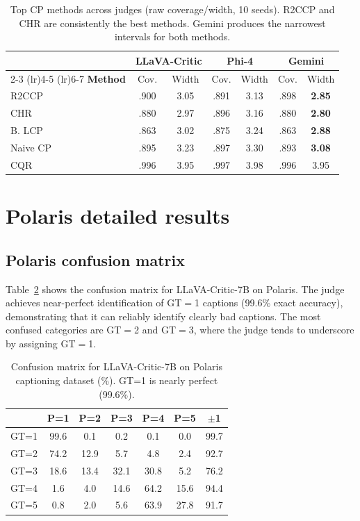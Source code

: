 \documentclass{article}
\begin{document}
\begin{table}[t]
\centering
\caption{Top CP methods across judges (raw coverage/width, 10 seeds). R2CCP and CHR are consistently the best methods. Gemini produces the narrowest intervals for both methods.}
\label{tab:all_methods_all_judges}
\small
\begin{tabular}{lcccccc}
\toprule
& \multicolumn{2}{c}{\textbf{LLaVA-Critic}} & \multicolumn{2}{c}{\textbf{Phi-4}} & \multicolumn{2}{c}{\textbf{Gemini}} \\
\cmidrule(lr){2-3} \cmidrule(lr){4-5} \cmidrule(lr){6-7}
\textbf{Method} & Cov. & Width & Cov. & Width & Cov. & Width \\
\midrule
R2CCP & .900 & 3.05 & .891 & 3.13 & .898 & \textbf{2.85} \\
CHR & .880 & 2.97 & .896 & 3.16 & .880 & \textbf{2.80} \\
B. LCP & .863 & 3.02 & .875 & 3.24 & .863 & \textbf{2.88} \\
Naive CP & .895 & 3.23 & .897 & 3.30 & .893 & \textbf{3.08} \\
CQR & .996 & 3.95 & .997 & 3.98 & .996 & 3.95 \\
\bottomrule
\end{tabular}
\end{table}

\section{Polaris detailed results}
\label{app:polaris}

\subsection{Polaris confusion matrix}

Table~\ref{tab:polaris_confusion} shows the confusion matrix for LLaVA-Critic-7B on Polaris. The judge achieves near-perfect identification of GT$=$1 captions (99.6\% exact accuracy), demonstrating that it can reliably identify clearly bad captions. The most confused categories are GT$=$2 and GT$=$3, where the judge tends to underscore by assigning GT$=$1.

\begin{table}[t]
\centering
\caption{Confusion matrix for LLaVA-Critic-7B on Polaris captioning dataset (\%). GT=1 is nearly perfect (99.6\%).}
\label{tab:polaris_confusion}
\small
\begin{tabular}{l|ccccc|c}
\toprule
& \textbf{P=1} & \textbf{P=2} & \textbf{P=3} & \textbf{P=4} & \textbf{P=5} & $\pm$\textbf{1} \\
\midrule
GT=1 & 99.6 & 0.1 & 0.2 & 0.1 & 0.0 & 99.7 \\
GT=2 & 74.2 & 12.9 & 5.7 & 4.8 & 2.4 & 92.7 \\
GT=3 & 18.6 & 13.4 & 32.1 & 30.8 & 5.2 & 76.2 \\
GT=4 & 1.6 & 4.0 & 14.6 & 64.2 & 15.6 & 94.4 \\
GT=5 & 0.8 & 2.0 & 5.6 & 63.9 & 27.8 & 91.7 \\
\bottomrule
\end{tabular}
\end{table}
\end{document}
